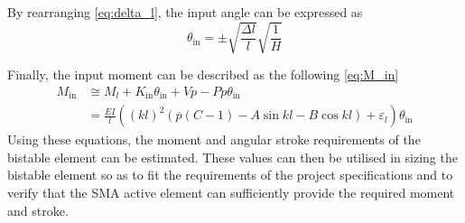 By rearranging \cref{eq:delta_l}, the input angle can be expressed as
\begin{equation}\label{eq:theta_in}
 {\theta}_\textrm{in}=\pm \sqrt{\frac{\Delta l}{l}}\sqrt{\frac{1}{H}}
\end{equation}

Finally, the input moment can be described as the following \cref{eq:M_in}
\begin{equation}
\begin{split}
 M_\textrm{in} &\cong M_l+K_\textrm{in}{\theta }_\textrm{in}+Vp-Pp{\theta}_\textrm{in}\\
 &=\frac{EI}{l}\left({\left(kl\right)}^2\left(\overline{p}\left(C-1\right)-A\sin{kl}-B\cos{kl}\right)+{\varepsilon }_l\right){\theta}_\textrm{in}
 \label{eq:M_in}
\end{split}
\end{equation}
 Using these equations, the moment and angular stroke requirements of the bistable element can be estimated. These values can then be utilised in sizing the bistable element so as to fit the requirements of the project specifications and to verify that the SMA active element can sufficiently provide the required moment and stroke.

